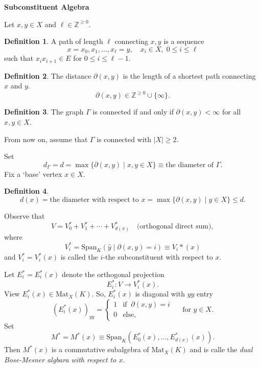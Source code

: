 \documentclass[
]{book}
\theoremstyle{definition}
\newtheorem{definition}{Definition}[chapter]
\theoremstyle{definition}
\theoremstyle{definition}
\theoremstyle{definition}
\theoremstyle{remark}
\begin{document}
\textbf{Subconstituent Algebra}

Let \(x, y\in X\) and \(\ell \in \mathbb{Z}^{\geq 0}\).

\begin{definition}
A path of length \(\ell\) connecting \(x, y\) is a sequence
\[x = x_0, x_1, \ldots, x_{\ell} = y, \quad x_i\in X, \; 0\leq i\leq \ell\]
such that \(x_ix_{i+1}\in E\) for \(0\leq i \leq \ell-1\).
\end{definition}

\begin{definition}
The distance \(\partial(x,y)\) is the length of a shortest path connecting \(x\) and \(y\).
\[\partial(x,y) \in \mathbb{Z}^{\geq 0} \cup \{\infty\}.\]
\end{definition}

\begin{definition}
The graph \(\Gamma\) is connected if and only if \(\partial(x,y) < \infty\) for all \(x, y\in X\).
\end{definition}

From now on, assume that \(\Gamma\) is connected with \(|X|\geq 2\).

Set
\[d_\Gamma = d = \max\{\partial(x,y)\mid x, y\in X\} \equiv \textrm{the diameter of }\Gamma.\]
Fix a `base' vertex \(x\in X\).

\begin{definition}
\[d(x) = \textrm{the diameter with respect to }x = \max\{\partial(x,y)\mid y\in X\} \leq d.\]
\end{definition}

Observe that
\[V = V_0^* + V_1^* + \cdots + V_{d(x)}^* \quad \textrm{(orthogonal direct sum)},\]
where
\[V_i^* = \mathrm{Span}_K(\hat{y}\mid \partial(x,y) = i) \equiv V_i*(x)\]
and \(V_i^* = V_i^*(x)\) is called the \(i\)-the subconstituent with respect to \(x\).

Let \(E_i^* = E_i^*(x)\) denote the orthogonal projection
\[E_i^*: V \longrightarrow V_i^*(x).\]
View \(E_i^*(x) \in \mathrm{Mat}_X(K)\). So, \(E_i^*(x)\) is diagonal with \(yy\) entry
\[(E_i^*(x))_{yy} = \begin{cases} 1 & \textrm{if } \: \partial(x,y) = i\\ 0 & \textrm{else,}\end{cases} \quad \textrm{ for } y\in X.\]
Set
\[M^* = M^*(x) \equiv \textrm{Span}_K(E_0^*(x), \ldots, E_{d(x)}^*(x)).\]
Then \(M^*(x)\) is a commutative subalgebra of \(\mathrm{Mat}_X(K)\) and is calle the \emph{dual Bose-Mesner algbara with respect to \(x\)}.
\end{document}
